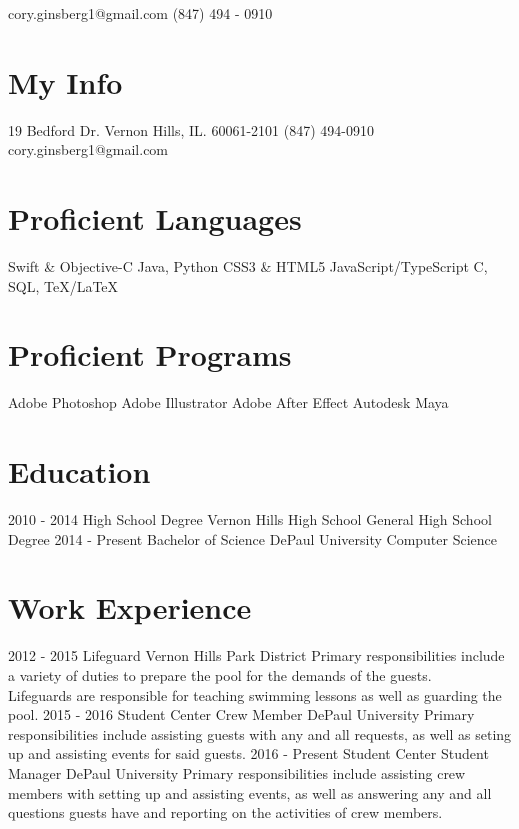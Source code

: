 \documentclass[]{resume-class}
\begin{document}
       {cory.ginsberg1@gmail.com \textbullet \hspace{0.01cm} (847) 494 - 0910}


\begin{aside}
  \section{My Info}
    19 Bedford Dr.
    Vernon Hills, IL.
    60061-2101
    (847) 494-0910
    cory.ginsberg1@gmail.com
  \section{Proficient Languages}
    Swift \& Objective-C
    Java, Python
    CSS3 \& HTML5
    JavaScript/TypeScript
    C, SQL, TeX/LaTeX
  \section{Proficient Programs}
    Adobe Photoshop
    Adobe Illustrator
    Adobe After Effect
    Autodesk Maya
\end{aside}

\section{Education}

\begin{entrylist}
  \entry
    {2010 - 2014}
    {High School Degree}
    {Vernon Hills High School}
    {General High School Degree}
  \entry
    {2014 - Present}
    {Bachelor of Science}
    {DePaul University}
    {Computer Science}
\end{entrylist}

\section{Work Experience}

\begin{entrylist}
  \entry
    {2012 - 2015}
    {Lifeguard}
    {Vernon Hills Park District}
    {Primary responsibilities include a variety of duties to prepare the pool for the demands of the guests.\\
Lifeguards are responsible for teaching swimming lessons as well as guarding the pool.}
  \entry
    {2015 - 2016}
    {Student Center Crew Member}
    {DePaul University}
    {Primary responsibilities include assisting guests with any and all requests, as well as seting up and assisting events for said guests.}
  \entry
    {2016 - Present}
    {Student Center Student Manager}
    {DePaul University}
    {Primary responsibilities include assisting crew members with setting up and assisting events, as well as answering any and all questions guests have and reporting on the activities of crew members.}
\end{entrylist}
\end{document}
